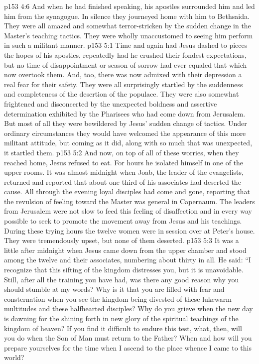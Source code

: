 \vs p153 4:6 And when he had finished speaking, his apostles surrounded him and led him from the synagogue. In silence they journeyed home with him to Bethsaida. They were all amazed and somewhat terror\hyp{}stricken by the sudden change in the Master’s teaching tactics. They were wholly unaccustomed to seeing him perform in such a militant manner.\plusone
{}
\vs p153 5:1 Time and again had Jesus dashed to pieces the hopes of his apostles, repeatedly had he crushed their fondest expectations, but no time of disappointment or season of sorrow had ever equaled that which now overtook them. And, too, there was now admixed with their depression a real fear for their safety. They were all surprisingly startled by the suddenness and completeness of the desertion of the populace. They were also somewhat frightened and disconcerted by the unexpected boldness and assertive determination exhibited by the Pharisees who had come down from Jerusalem. But most of all they were bewildered by Jesus’ sudden change of tactics. Under ordinary circumstances they would have welcomed the appearance of this more militant attitude, but coming as it did, along with so much that was unexpected, it startled them.
\vs p153 5:2 And now, on top of all of these worries, when they reached home, Jesus refused to eat. For hours he isolated himself in one of the upper rooms. It was almost midnight when Joab, the leader of the evangelists, returned and reported that about one third of his associates had deserted the cause. All through the evening loyal disciples had come and gone, reporting that the revulsion of feeling toward the Master was general in Capernaum. The leaders from Jerusalem were not slow to feed this feeling of disaffection and in every way possible to seek to promote the movement away from Jesus and his teachings. During these trying hours the twelve women were in session over at Peter’s house. They were tremendously upset, but none of them deserted.
\vs p153 5:3 It was a little after midnight when Jesus came down from the upper chamber and stood among the twelve and their associates, numbering about thirty in all. He said: \textcolor{ubdarkred}{“I recognize that this sifting of the kingdom distresses you, but it is unavoidable. Still, after all the training you have had, was there any good reason why you should stumble at my words? Why is it that you are filled with fear and consternation when you see the kingdom being divested of these lukewarm multitudes and these halfhearted disciples? Why do you grieve when the new day is dawning for the shining forth in new glory of the spiritual teachings of the kingdom of heaven? If you find it difficult to endure this test, what, then, will you do when the Son of Man must return to the Father? When and how will you prepare yourselves for the time when I ascend to the place whence I came to this world?}\plusone
